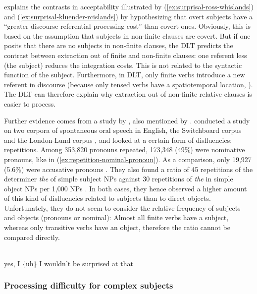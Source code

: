 \citet[110]{Kluender.2004} explains the contrasts in acceptability illustrated by (\ref{ex:surprisal-ross-whislands}) and (\ref{ex:surprisal-kluender-rcislands}) by hypothesizing that overt subjects have a ``greater discourse referential processing cost'' than covert ones. Obviously, this is based on the assumption that subjects in non-finite clauses are covert. But if one posits that there are no subjects in non-finite clauses, the DLT predicts the contrast between extraction out of finite and non-finite clauses: one referent less (the subject) reduces the integration costs. This is not related to the syntactic function of the subject. Furthermore, in DLT, only finite verbs introduce a new referent in discourse (because only tensed verbs have a spatiotemporal location, \citealt[103]{Gibson.2000}). The DLT can therefore explain why extraction out of non-finite relative clauses is easier to process. 

Further evidence comes from a study by \citet{Clark.1998}, also mentioned by \citet[114]{Kluender.2004}. 
\citet{Clark.1998} conducted a study on two corpora of spontaneous oral speech in English, the Switchboard corpus \citep{Godfrey.1992} and the London-Lund corpus \citep{Svartvik.1980}, and looked at a certain form of disfluencies: repetitions. Among 353,820 pronouns repeated, 173,348 (49\%) were nominative pronouns, like in (\ref{ex:repetition-nominal-pronoun}). As a comparison, only 19,927 (5.6\%) were accusative pronouns \citep[215]{Clark.1998}. They also found a ratio of 45 repetitions of the determiner \emph{the} of simple subject NPs against 30 repetitions of \emph{the} in simple object NPs per 1,000 NPs \citep[213]{Clark.1998}. In both cases, they hence observed a higher amount of this kind of disfluencies related to subjects than to direct objects. Unfortunately, they do not seem to consider the relative frequency of subjects and objects (pronouns or nominal): Almost all finite verbs have a subject, whereas only transitive verbs have an object, therefore the ratio cannot be compared directly.

\ea  \citep[220]{Clark.1998}\\
yes, I \{uh\} I wouldn't be surprised at that
\label{ex:repetition-nominal-pronoun}
\z 

\subsubsection{Processing difficulty for complex subjects}

